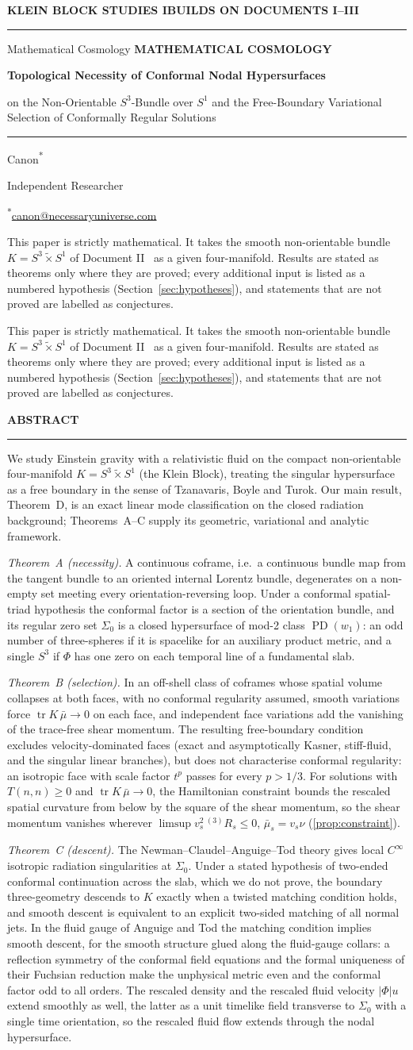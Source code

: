 \documentclass[11pt]{article}
\makeatletter
\theoremstyle{canonmath}
\theoremstyle{canonpostulate}
\theoremstyle{canonproposition}
\theoremstyle{canonmath}
\theoremstyle{canonproposition}
\providecommand{\PD}{\operatorname{PD}}
\providecommand{\Klein}{\mathcal{K}}
\def\mathcal#1{#1}%
\newcommand{\CanonTitlePage}{%
\begin{titlepage}
\thispagestyle{titlepage}
\vspace*{0.62cm}
{\sffamily\footnotesize\bfseries\color{seriesMuted}
\CanonArchitecture \hfill \CanonStage\par}%
\vspace{0.42cm}
{\color{seriesAccent}\rule{\textwidth}{1.05pt}}\par
\vspace{1.65cm}
\ifx\CanonGenre\empty
\else
{\sffamily\footnotesize\bfseries\color{seriesMuted}\MakeUppercase{\CanonGenre}}\par
\vspace{0.45cm}\fi
{\sffamily\bfseries\fontsize{28}{32}\selectfont\color{seriesInk}\hyphenpenalty=10000\exhyphenpenalty=10000\CanonTitle\par}
\vspace{0.52cm}
{\sffamily\large\color{seriesAccent}\CanonSubtitle\par}
\vspace{0.78cm}
{\color{seriesAccent}\rule{0.24\textwidth}{0.9pt}}\par
\vspace{0.95cm}
{\normalsize\sffamily Canon\textsuperscript{*}\;\orcidlink{0009-0001-9037-6209}\par}
\vspace{0.25cm}
{\small\sffamily\color{seriesMuted}Independent Researcher\par}
\vspace{0.16cm}
{\small\sffamily\color{seriesMuted}\textsuperscript{*}\href{mailto:canon@necessaryuniverse.com}{canon@necessaryuniverse.com}\par}
\vfill
\ifx\CanonDeck\empty
\else
  \begin{tcolorbox}[
    enhanced,
    colback=seriesPaper,
    colframe=seriesRule,
    boxrule=0.45pt,
    leftrule=2.4pt,
    arc=1.5pt,
    left=11pt,right=11pt,top=9pt,bottom=9pt,
    width=0.94\textwidth
  ]
  \small\sffamily\color{seriesMuted}
  \CanonDeck
  \end{tcolorbox}
  \vspace{0.65cm}
\fi

\end{titlepage}
}
\newenvironment{CanonAbstract}{%
  \begin{center}
  {\sffamily\footnotesize\bfseries\color{seriesMuted}\MakeUppercase{Abstract}}\\[-0.05em]
  {\color{seriesAccent}\rule{0.16\textwidth}{0.75pt}}
  \end{center}
  \begin{tcolorbox}[
    enhanced,
    breakable,
    colback=white,
    colframe=seriesRule,
    boxrule=0.4pt,
    leftrule=2.2pt,
    arc=1pt,
    left=12pt,right=12pt,top=9pt,bottom=9pt,
    before skip=5pt,after skip=4pt
  ]
  \small
}{%
  \end{tcolorbox}
}
\newcommand{\CanonArchitecture}{KLEIN BLOCK STUDIES I}
\newcommand{\CanonStage}{BUILDS ON DOCUMENTS I--III}
\newcommand{\CanonGenre}{Mathematical Cosmology}
\newcommand{\CanonTitle}{Topological Necessity of Conformal Nodal Hypersurfaces}
\newcommand{\CanonSubtitle}{on the Non-Orientable $S^3$-Bundle over $S^1$ and the Free-Boundary Variational Selection of Conformally Regular Solutions}
\newcommand{\CanonDeck}{This paper is strictly mathematical. It takes the smooth non-orientable bundle $\Klein = S^3 \tilde{\times} S^1$ of Document II~\cite{DocII} as a given four-manifold. Results are stated as theorems only where they are proved; every additional input is listed as a numbered hypothesis (Section~\ref{sec:hypotheses}), and statements that are not proved are labelled as conjectures.}
\makeatother
\begin{document}
\CanonTitlePage

\setcounter{page}{1}

\begin{CanonAbstract}
We study Einstein gravity with a relativistic fluid on the compact non-orientable four-manifold $\Klein = S^3 \tilde{\times} S^1$ (the Klein Block), treating the singular hypersurface as a free boundary in the sense of Tzanavaris, Boyle and Turok. Our main result, Theorem~D, is an exact linear mode classification on the closed radiation background; Theorems~A--C supply its geometric, variational and analytic framework.

\emph{Theorem~A (necessity).} A continuous coframe, i.e.\ a continuous bundle map from the tangent bundle to an oriented internal Lorentz bundle, degenerates on a non-empty set meeting every orientation-reversing loop. Under a conformal spatial-triad hypothesis the conformal factor is a section of the orientation bundle, and its regular zero set $\Sigma_0$ is a closed hypersurface of mod-2 class $\PD(w_1)$: an odd number of three-spheres if it is spacelike for an auxiliary product metric, and a single $S^3$ if $\Phi$ has one zero on each temporal line of a fundamental slab.

\emph{Theorem~B (selection).} In an off-shell class of coframes whose spatial volume collapses at both faces, with no conformal regularity assumed, smooth variations force $\operatorname{tr}K\,\bar\mu\to0$ on each face, and independent face variations add the vanishing of the trace-free shear momentum. The resulting free-boundary condition excludes velocity-dominated faces (exact and asymptotically Kasner, stiff-fluid, and the singular linear branches), but does not characterise conformal regularity: an isotropic face with scale factor $t^p$ passes for every $p>1/3$. For solutions with $T(n,n)\ge0$ and $\operatorname{tr}K\,\bar\mu\to0$, the Hamiltonian constraint bounds the rescaled spatial curvature from below by the square of the shear momentum, so the shear momentum vanishes wherever $\limsup v_s^2\,{}^{(3)}\!R_s\le0$, $\bar\mu_s = v_s\nu$ (\cref{prop:constraint}).

\emph{Theorem~C (descent).} The Newman--Claudel--Anguige--Tod theory gives local $C^\infty$ isotropic radiation singularities at $\Sigma_0$. Under a stated hypothesis of two-ended conformal continuation across the slab, which we do not prove, the boundary three-geometry descends to $\Klein$ exactly when a twisted matching condition holds, and smooth descent is equivalent to an explicit two-sided matching of all normal jets. In the fluid gauge of Anguige and Tod the matching condition implies smooth descent, for the smooth structure glued along the fluid-gauge collars: a reflection symmetry of the conformal field equations and the formal uniqueness of their Fuchsian reduction make the unphysical metric even and the conformal factor odd to all orders. The rescaled density and the rescaled fluid velocity $|\Phi|u$ extend smoothly as well, the latter as a unit timelike field transverse to $\Sigma_0$ with a single time orientation, so the rescaled fluid flow extends through the nodal hypersurface.


\end{CanonAbstract}
\end{document}

